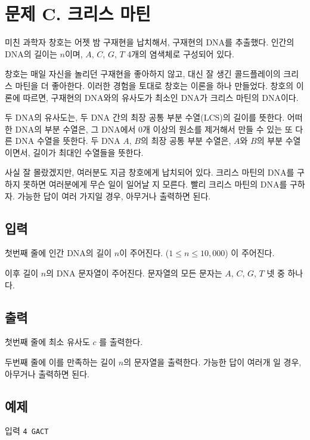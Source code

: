 \documentclass{article}
\begin{document}
\section{문제 C. 크리스 마틴}
미친 과학자 창호는 어젯 밤 구재현을 납치해서, 구재현의 DNA를 추출했다. 인간의 DNA의 길이는 $n$이며, $A$, $C$, $G$, $T$ 4개의 염색체로 구성되어 있다. \newline

창호는 매일 자신을 놀리던 구재현을 좋아하지 않고, 대신 잘 생긴 콜드플레이의 크리스 마틴을 더 좋아한다. 이러한 경험을 토대로 창호는 이론을 하나 만들었다. 창호의 이론에 따르면, 구재현의 DNA와의 유사도가 최소인 DNA가 크리스 마틴의 DNA이다. \newline

두 DNA의 유사도는, 두 DNA 간의 최장 공통 부분 수열(LCS)의 길이를 뜻한다. 어떠한 DNA의 부분 수열은, 그 DNA에서 0개 이상의 원소를 제거해서 만들 수 있는 또 다른 DNA 수열을 뜻한다. 두 DNA $A$, $B$의 최장 공통 부분 수열은, $A$와 $B$의 부분 수열이면서, 길이가 최대인 수열들을 뜻한다. \newline

사실 잘 몰랐겠지만, 여러분도 지금 창호에게 납치되어 있다. 크리스 마틴의 DNA를 구하지 못하면 여러분에게 무슨 일이 일어날 지 모른다. 빨리 크리스 마틴의 DNA를 구하자. 가능한 답이 여러 가지일 경우, 아무거나 출력하면 된다.

\subsection{입력}
첫번째 줄에 인간 DNA의 길이 $n$이 주어진다. ($1 \leq n \leq 10,000$) 이 주어진다. \newline

이후 길이 $n$의 DNA 문자열이 주어진다. 문자열의 모든 문자는 $A$, $C$, $G$, $T$ 넷 중 하나다.

\subsection{출력}
첫번째 줄에 최소 유사도 $c$ 를 출력한다. \newline

두번째 줄에 이를 만족하는 길이 $n$의 문자열을 출력한다. 가능한 답이 여러개 일 경우, 아무거나 출력하면 된다.

\subsection{예제}
입력
\bgroup\obeylines
\texttt{4
	GACT	\newline}
\egroup
\end{document}
